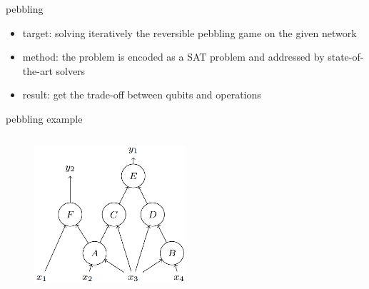 \begin{frame}{pebbling}
  \begin{itemize}
    \item target: solving iteratively the reversible pebbling game on the given network
    \item method: the problem is encoded as a SAT problem and addressed by state-of-the-art solvers
    \item result: get the trade-off between qubits and operations
  \end{itemize}
\end{frame}
\begin{frame}{pebbling example}
  \begin{columns}
      \begin{minipage}[c][0.4\textheight][c]{\linewidth}
        \begin{figure}[h]
          \centering
          \includegraphics[width=0.5\textwidth]{figure/DAG.png}
        \end{figure}
          
      \end{minipage}


\end{columns}
\end{frame}
